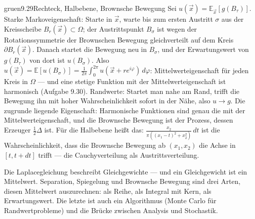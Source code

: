 \begin{loesungkarte}{gruen}{9.29}{Rechteck, Halbebene, Brownsche Bewegung}
Sei $u(\vec x) = \mathbb E_{\vec x}[g(B_\tau)]$. Starke Markoveigenschaft: Starte in $\vec x$, warte bis zum ersten Austritt $\sigma$ aus der Kreisscheibe $B_r(\vec x)\subset\Omega$; der Austrittspunkt $B_\sigma$ ist wegen der Rotationssymmetrie der Brownschen Bewegung gleichverteilt auf dem Kreis $\partial B_r(\vec x)$. Danach startet die Bewegung neu in $B_\sigma$, und der Erwartungswert von $g(B_\tau)$ von dort ist $u(B_\sigma)$. Also $u(\vec x) = \mathbb E[u(B_\sigma)] = \frac1{2\pi}\int_0^{2\pi}u(\vec x + re^{i\varphi})\,d\varphi$: Mittelwerteigenschaft für jeden Kreis in $\Omega$ --- und eine stetige Funktion mit der Mittelwerteigenschaft ist harmonisch (Aufgabe 9.30). Randwerte: Startet man nahe am Rand, trifft die Bewegung ihn mit hoher Wahrscheinlichkeit sofort in der Nähe, also $u\to g$. Die zugrunde liegende Eigenschaft: Harmonische Funktionen sind genau die mit der Mittelwerteigenschaft, und die Brownsche Bewegung ist der Prozess, dessen Erzeuger $\frac12\Delta$ ist. Für die Halbebene heißt das: $\frac{x_2}{\pi((x_1 - t)^{2} + x_2^{2})}\,dt$ ist die Wahrscheinlichkeit, dass die Brownsche Bewegung ab $(x_1, x_2)$ die Achse in $[t, t + dt]$ trifft --- die Cauchyverteilung als Austrittsverteilung.
\begin{mitnehmen}\kastentext
Die Laplacegleichung beschreibt Gleichgewichte --- und ein Gleichgewicht ist ein Mittelwert. Separation, Spiegelung und Brownsche Bewegung sind drei Arten, diesen Mittelwert auszurechnen: als Reihe, als Integral mit Kern, als Erwartungswert. Die letzte ist auch ein Algorithmus (Monte Carlo für Randwertprobleme) und die Brücke zwischen Analysis und Stochastik.
\end{mitnehmen}
\end{loesungkarte}

